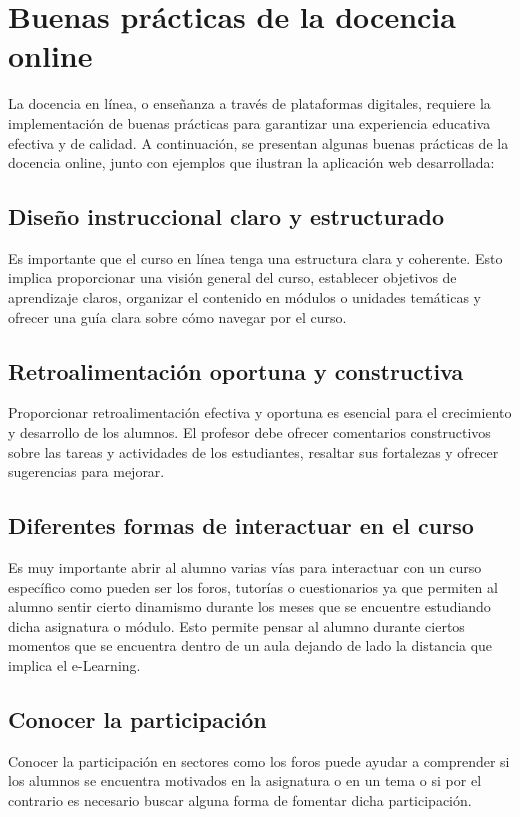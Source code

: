 \section{Buenas prácticas de la docencia online}
La docencia en línea, o enseñanza a través de plataformas digitales, requiere la implementación de buenas prácticas para garantizar una experiencia educativa efectiva y de calidad. A continuación, se presentan algunas buenas prácticas de la docencia online, junto con ejemplos que ilustran la aplicación web desarrollada:

\subsection{Diseño instruccional claro y estructurado}
Es importante que el curso en línea tenga una estructura clara y coherente. Esto implica proporcionar una visión general del curso, establecer objetivos de aprendizaje claros, organizar el contenido en módulos o unidades temáticas y ofrecer una guía clara sobre cómo navegar por el curso. 

\subsection{Retroalimentación oportuna y constructiva}
Proporcionar retroalimentación efectiva y oportuna es esencial para el crecimiento y desarrollo de los alumnos. El profesor debe ofrecer comentarios constructivos sobre las tareas y actividades de los estudiantes, resaltar sus fortalezas y ofrecer sugerencias para mejorar.

\subsection{Diferentes formas de interactuar en el curso}
Es muy importante abrir al alumno varias vías para interactuar con un curso específico como pueden ser los foros, tutorías o cuestionarios ya que permiten al alumno sentir cierto dinamismo durante los meses que se encuentre estudiando dicha asignatura o módulo. Esto permite pensar al alumno durante ciertos momentos que se encuentra dentro de un aula dejando de lado la distancia que implica el e-Learning.

\subsection{Conocer la participación}
Conocer la participación en sectores como los foros puede ayudar a comprender si los alumnos se encuentra motivados en la asignatura o en un tema o si por el contrario es necesario buscar alguna forma de fomentar dicha participación.

